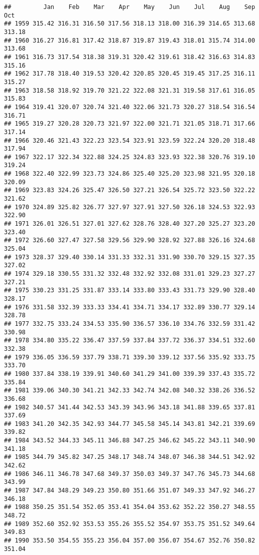 \documentclass[
]{article}
\begin{document}
\begin{verbatim}
##         Jan    Feb    Mar    Apr    May    Jun    Jul    Aug    Sep    Oct
## 1959 315.42 316.31 316.50 317.56 318.13 318.00 316.39 314.65 313.68 313.18
## 1960 316.27 316.81 317.42 318.87 319.87 319.43 318.01 315.74 314.00 313.68
## 1961 316.73 317.54 318.38 319.31 320.42 319.61 318.42 316.63 314.83 315.16
## 1962 317.78 318.40 319.53 320.42 320.85 320.45 319.45 317.25 316.11 315.27
## 1963 318.58 318.92 319.70 321.22 322.08 321.31 319.58 317.61 316.05 315.83
## 1964 319.41 320.07 320.74 321.40 322.06 321.73 320.27 318.54 316.54 316.71
## 1965 319.27 320.28 320.73 321.97 322.00 321.71 321.05 318.71 317.66 317.14
## 1966 320.46 321.43 322.23 323.54 323.91 323.59 322.24 320.20 318.48 317.94
## 1967 322.17 322.34 322.88 324.25 324.83 323.93 322.38 320.76 319.10 319.24
## 1968 322.40 322.99 323.73 324.86 325.40 325.20 323.98 321.95 320.18 320.09
## 1969 323.83 324.26 325.47 326.50 327.21 326.54 325.72 323.50 322.22 321.62
## 1970 324.89 325.82 326.77 327.97 327.91 327.50 326.18 324.53 322.93 322.90
## 1971 326.01 326.51 327.01 327.62 328.76 328.40 327.20 325.27 323.20 323.40
## 1972 326.60 327.47 327.58 329.56 329.90 328.92 327.88 326.16 324.68 325.04
## 1973 328.37 329.40 330.14 331.33 332.31 331.90 330.70 329.15 327.35 327.02
## 1974 329.18 330.55 331.32 332.48 332.92 332.08 331.01 329.23 327.27 327.21
## 1975 330.23 331.25 331.87 333.14 333.80 333.43 331.73 329.90 328.40 328.17
## 1976 331.58 332.39 333.33 334.41 334.71 334.17 332.89 330.77 329.14 328.78
## 1977 332.75 333.24 334.53 335.90 336.57 336.10 334.76 332.59 331.42 330.98
## 1978 334.80 335.22 336.47 337.59 337.84 337.72 336.37 334.51 332.60 332.38
## 1979 336.05 336.59 337.79 338.71 339.30 339.12 337.56 335.92 333.75 333.70
## 1980 337.84 338.19 339.91 340.60 341.29 341.00 339.39 337.43 335.72 335.84
## 1981 339.06 340.30 341.21 342.33 342.74 342.08 340.32 338.26 336.52 336.68
## 1982 340.57 341.44 342.53 343.39 343.96 343.18 341.88 339.65 337.81 337.69
## 1983 341.20 342.35 342.93 344.77 345.58 345.14 343.81 342.21 339.69 339.82
## 1984 343.52 344.33 345.11 346.88 347.25 346.62 345.22 343.11 340.90 341.18
## 1985 344.79 345.82 347.25 348.17 348.74 348.07 346.38 344.51 342.92 342.62
## 1986 346.11 346.78 347.68 349.37 350.03 349.37 347.76 345.73 344.68 343.99
## 1987 347.84 348.29 349.23 350.80 351.66 351.07 349.33 347.92 346.27 346.18
## 1988 350.25 351.54 352.05 353.41 354.04 353.62 352.22 350.27 348.55 348.72
## 1989 352.60 352.92 353.53 355.26 355.52 354.97 353.75 351.52 349.64 349.83
## 1990 353.50 354.55 355.23 356.04 357.00 356.07 354.67 352.76 350.82 351.04

\end{verbatim}
\end{document}
